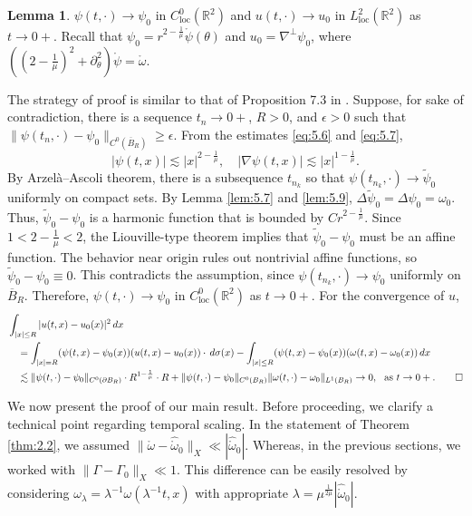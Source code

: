 \documentclass[11pt]{article}
\makeatletter
\renewenvironment{proof}[1][\proofname]{\par
  \vspace{-.7\topsep}%
  \pushQED{\qed}%
  \normalfont
  \topsep0pt \partopsep0pt %
  \trivlist
  \item[\hskip\labelsep
        \itshape
    #1\@addpunct{.}]\ignorespaces
}{%
  \popQED\endtrivlist\@endpefalse
  \addvspace{6pt plus 6pt} %
}
\theoremstyle{definition}
\newtheorem{lemma}[theorem]{Lemma}
\theoremstyle{remark}
\numberwithin{equation}{section}
\newcommand{\mbb}{\mathbb}
\renewcommand{\hat}{\widehat}
\renewcommand{\tilde}{\widetilde}
\renewcommand{\bar}{\overline}
\newcommand{\R}{\mbb{R}}
\newcommand{\del}{\partial}
\newcommand{\grad}{\nabla}
\newcommand{\norm}[1]{\lVert #1 \rVert}
\makeatother
\begin{document}
\begin{lemma} \label{lem:5.10}
$\psi(t,\cdot) \to \psi_0$ in $C^0_{\text{loc}}(\R^2)$ and $u(t,\cdot) \to u_0$ in $L^2_{\text{loc}}(\R^2)$ as $t\to 0+$. Recall that $\psi_0 = r^{2-\frac{1}{\mu}} \mathring{\psi}(\theta)$ and $u_0 = \grad^\perp \psi_0$, where $((2-\frac{1}{\mu})^2 + \del_\theta^2)\mathring{\psi} = \mathring{\omega}$.
\end{lemma}
\begin{proof}
The strategy of proof is similar to that of Proposition 7.3 in \cite{SWZ25}. Suppose, for sake of contradiction, there is a sequence $t_n \to 0+$, $R>0$, and $\epsilon > 0$ such that $\norm{\psi(t_n,\cdot) - \psi_0}_{C^0(\bar{B}_R)} \geq \epsilon$. From the estimates \eqref{eq:5.6} and \eqref{eq:5.7},
\[|\psi(t,x)| \lesssim |x|^{2-\frac{1}{\mu}}, \quad |\grad \psi(t,x)| \lesssim |x|^{1 - \frac{1}{\mu}}.\]
By Arzelà–Ascoli theorem, there is a subsequence $t_{n_k}$ so that $\psi(t_{n_k}, \cdot) \to \tilde{\psi}_0$ uniformly on compact sets. By Lemma \ref{lem:5.7} and \ref{lem:5.9}, $\Delta \tilde{\psi}_0 = \Delta \psi_0 = \omega_0$. Thus, $\tilde{\psi}_0 - \psi_0$ is a harmonic function that is bounded by $Cr^{2-\frac{1}{\mu}}$. Since $1 < 2 - \frac{1}{\mu} < 2$, the Liouville-type theorem implies that $\tilde{\psi}_0 - \psi_0$ must be an affine function. The behavior near origin rules out nontrivial affine functions, so $\tilde{\psi}_0 - \psi_0 \equiv 0$. This contradicts the assumption, since $\psi(t_{n_k}, \cdot) \to \psi_0$ uniformly on $\bar{B}_R$. Therefore, $\psi(t,\cdot) \to \psi_0$ in $C^0_{\text{loc}}(\R^2)$ as $t\to 0+$. For the convergence of $u$,
\begin{align*}
&\int_{|x|\leq R} |u(t,x) - u_0(x)|^2 \,dx \\
& \quad = \int_{|x| = R} (\psi(t,x) - \psi_0(x)) (u(t,x) - u_0(x)) \cdot \,d\sigma(x) - \int_{|x|\leq R} (\psi(t,x) - \psi_0(x)) (\omega(t,x) - \omega_0(x)) \,dx \\
& \quad \lesssim \norm{\psi(t,\cdot) - \psi_0}_{C^0(\del B_R)} \cdot R^{1-\frac{1}{\mu}} \cdot R + \norm{\psi(t,\cdot) - \psi_0}_{C^0(B_R)} \norm{\omega(t,\cdot) - \omega_0}_{L^1(B_R)} \to 0 ,~~\text{as}~t\to 0+. \qedhere
\end{align*}
\end{proof}

We now present the proof of our main result. Before proceeding, we clarify a technical point regarding temporal scaling. In the statement of Theorem \ref{thm:2.2}, we assumed $\norm{\mathring{\omega} - \hat{\mathring{\omega}}_0}_X \ll |\hat{\mathring{\omega}}_0|$. Whereas, in the previous sections, we worked with $\norm{\Gamma - \Gamma_0}_X \ll 1$. This difference can be easily resolved by considering $\omega_\lambda = \lambda^{-1} \omega(\lambda^{-1} t, x)$ with appropriate $\lambda = \mu^{\frac{1}{2\mu}} |\hat{\mathring{\omega}}_0|$.
\end{document}
